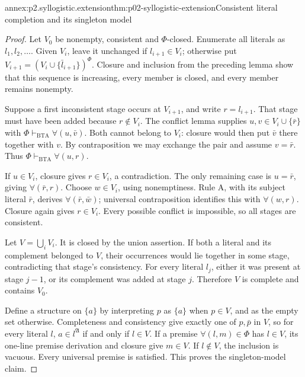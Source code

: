 \begin{annexitem}{annex:p2.syllogistic.extension}{thm:p02-syllogistic-extension}{Consistent literal completion and its singleton model}
\begin{proof}
Let \(V_0\) be nonempty, consistent and \(\Phi\)-closed. Enumerate all
literals as \(l_1,l_2,\ldots\). Given \(V_i\), leave it unchanged if
\(l_{i+1}\in V_i\); otherwise put
\(V_{i+1}=(V_i\cup\{\bar l_{i+1}\})^\Phi\).
Closure and inclusion from the preceding lemma show that this sequence is
increasing, every member is closed, and every member remains nonempty.

Suppose a first inconsistent stage occurs at \(V_{i+1}\), and write
\(r=l_{i+1}\). That stage must have been added because \(r\notin V_i\).
The conflict lemma supplies \(u,v\in V_i\cup\{\bar r\}\) with
\(\Phi\vdash_{\mathrm{BTA}}\forall(u,\bar v)\). Both cannot belong
to \(V_i\): closure would then put \(\bar v\) there together with \(v\).
By contraposition we may exchange the pair and assume \(v=\bar r\).
Thus \(\Phi\vdash_{\mathrm{BTA}}\forall(u,r)\).

If \(u\in V_i\), closure gives \(r\in V_i\), a contradiction. The only
remaining case is \(u=\bar r\), giving \(\forall(\bar r,r)\).
Choose \(w\in V_i\), using nonemptiness. Rule A, with its subject literal
\(\bar r\), derives \(\forall(\bar r,\bar w)\); universal contraposition
identifies this with \(\forall(w,r)\). Closure again gives \(r\in V_i\).
Every possible conflict is impossible, so all stages are consistent.

Let \(V=\bigcup_i V_i\). It is closed by the union assertion. If both a
literal and its complement belonged to \(V\), their occurrences would lie
together in some stage, contradicting that stage's consistency. For every
literal \(l_j\), either it was present at stage \(j-1\), or its complement
was added at stage \(j\). Therefore \(V\) is complete and contains \(V_0\).

Define a structure on \(\{a\}\) by interpreting \(p\) as \(\{a\}\) when
\(p\in V\), and as the empty set otherwise. Completeness and consistency
give exactly one of \(p,\bar p\) in \(V\), so for every literal \(l\),
\(a\in l^{\mathfrak A}\) if and only if \(l\in V\). If a premise
\(\forall(l,m)\in\Phi\) has \(l\in V\), its one-line premise derivation
and closure give \(m\in V\). If \(l\notin V\), the inclusion is vacuous.
Every universal premise is satisfied. This proves the singleton-model claim.
\end{proof}
\end{annexitem}

